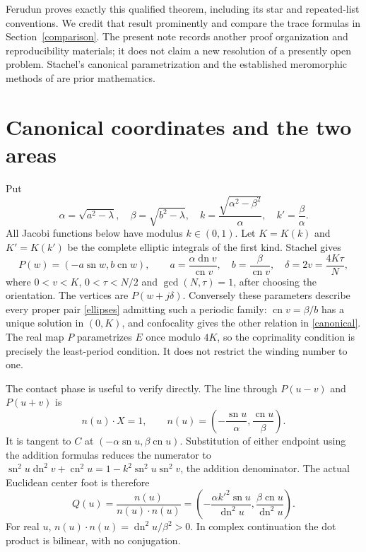 \documentclass[11pt]{article}
\newcommand{\sn}{\operatorname{sn}}
\newcommand{\cn}{\operatorname{cn}}
\newcommand{\dn}{\operatorname{dn}}
\begin{document}
Ferudun \cite[Theorem~1]{Ferudun} proves exactly this qualified theorem,
including its star and repeated-list conventions. We credit that result
prominently and compare the trace formulas in Section~\ref{comparison}.
The present note records another proof organization and reproducibility
materials; it does not claim a new resolution of a presently open problem.
Stachel's canonical parametrization and the established meromorphic
methods of \cite{AST,Chavez} are prior mathematics.

\section{Canonical coordinates and the two areas}
Put
\[
 \alpha=\sqrt{a^2-\lambda},\quad
 \beta=\sqrt{b^2-\lambda},\quad
 k=\frac{\sqrt{\alpha^2-\beta^2}}{\alpha},\quad k'=\frac\beta\alpha.
\]
All Jacobi functions below have modulus $k\in(0,1)$. Let $K=K(k)$ and
$K'=K(k')$ be the complete elliptic integrals of the first kind.
Stachel \cite[Theorem~4.3 and (4.9)]{Stachel} gives
\begin{equation}\label{canonical}
 P(w)=(-a\sn w,b\cn w),\qquad
 a=\frac{\alpha\dn v}{\cn v},\quad b=\frac\beta{\cn v},\quad
 \delta=2v=\frac{4K\tau}{N},
\end{equation}
where $0<v<K$, $0<\tau<N/2$ and $\gcd(N,\tau)=1$, after choosing
the orientation. The vertices are $P(w+j\delta)$. Conversely these
parameters describe every proper pair \eqref{ellipses} admitting such a
periodic family: $\cn v=\beta/b$ has a unique solution in $(0,K)$,
and confocality gives the other relation in \eqref{canonical}.
The real map $P$ parametrizes $E$ once modulo $4K$, so the coprimality
condition is precisely the least-period condition. It does not restrict
the winding number to one.

The contact phase is useful to verify directly. The line through
$P(u-v)$ and $P(u+v)$ is
\begin{equation}\label{tangent}
 n(u)\cdot X=1,\qquad
 n(u)=\left(-\frac{\sn u}{\alpha},\frac{\cn u}{\beta}\right).
\end{equation}
It is tangent to $C$ at $(-\alpha\sn u,\beta\cn u)$. Substitution
of either endpoint using the addition formulas reduces the numerator to
$\sn^2u\dn^2v+\cn^2u=1-k^2\sn^2u\sn^2v$, the addition
denominator. The actual Euclidean center foot is therefore
\begin{equation}\label{Q}
 Q(u)=\frac{n(u)}{n(u)\cdot n(u)}
 =\left(-\frac{\alpha k'^2\sn u}{\dn^2u},
             \frac{\beta\cn u}{\dn^2u}\right).
\end{equation}
For real $u$, $n(u)\cdot n(u)=\dn^2u/\beta^2>0$. In complex
continuation the dot product is bilinear, with no conjugation.
\end{document}
